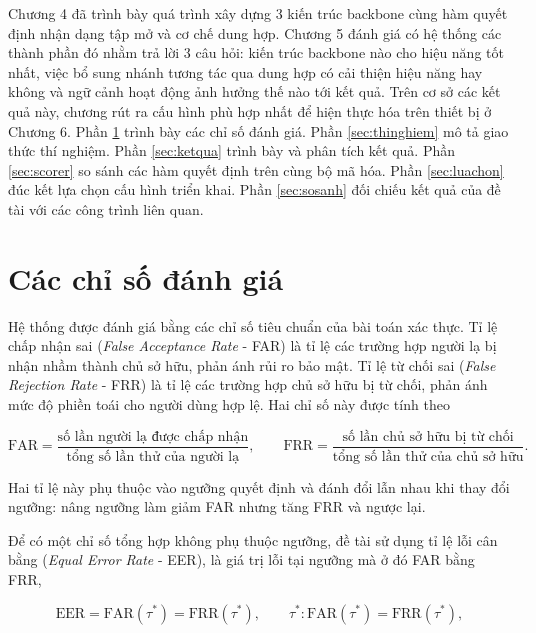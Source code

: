 \documentclass[../DoAn.tex]{subfiles}
\begin{document}
Chương 4 đã trình bày quá trình xây dựng 3 kiến trúc backbone cùng hàm quyết định nhận dạng tập mở và cơ chế dung hợp. Chương 5 đánh giá có hệ thống các thành phần đó nhằm trả lời 3 câu hỏi: kiến trúc backbone nào cho hiệu năng tốt nhất, việc bổ sung nhánh tương tác qua dung hợp có cải thiện hiệu năng hay không và ngữ cảnh hoạt động ảnh hưởng thế nào tới kết quả. Trên cơ sở các kết quả này, chương rút ra cấu hình phù hợp nhất để hiện thực hóa trên thiết bị ở Chương 6. Phần \ref{sec:thamso} trình bày các chỉ số đánh giá. Phần \ref{sec:thinghiem} mô tả giao thức thí nghiệm. Phần \ref{sec:ketqua} trình bày và phân tích kết quả. Phần \ref{sec:scorer} so sánh các hàm quyết định trên cùng bộ mã hóa. Phần \ref{sec:luachon} đúc kết lựa chọn cấu hình triển khai. Phần \ref{sec:sosanh} đối chiếu kết quả của đề tài với các công trình liên quan.

\section{Các chỉ số đánh giá}
\label{sec:thamso}

Hệ thống được đánh giá bằng các chỉ số tiêu chuẩn của bài toán xác thực. Tỉ lệ chấp nhận sai (\textit{False Acceptance Rate} - FAR) là tỉ lệ các trường hợp người lạ bị nhận nhầm thành chủ sở hữu, phản ánh rủi ro bảo mật. Tỉ lệ từ chối sai (\textit{False Rejection Rate} - FRR) là tỉ lệ các trường hợp chủ sở hữu bị từ chối, phản ánh mức độ phiền toái cho người dùng hợp lệ. Hai chỉ số này được tính theo

\begin{equation}
    \text{FAR} = \frac{\text{số lần người lạ được chấp nhận}}{\text{tổng số lần thử của người lạ}},
    \qquad
    \text{FRR} = \frac{\text{số lần chủ sở hữu bị từ chối}}{\text{tổng số lần thử của chủ sở hữu}}.
    \label{eq:far_frr}
\end{equation}

Hai tỉ lệ này phụ thuộc vào ngưỡng quyết định và đánh đổi lẫn nhau khi thay đổi ngưỡng: nâng ngưỡng làm giảm FAR nhưng tăng FRR và ngược lại.

Để có một chỉ số tổng hợp không phụ thuộc ngưỡng, đề tài sử dụng tỉ lệ lỗi cân bằng (\textit{Equal Error Rate} - EER), là giá trị lỗi tại ngưỡng mà ở đó FAR bằng FRR,

\begin{equation}
    \text{EER} = \text{FAR}(\tau^*) = \text{FRR}(\tau^*),
    \qquad \tau^* : \text{FAR}(\tau^*) = \text{FRR}(\tau^*),
    \label{eq:eer}
\end{equation}
\end{document}
